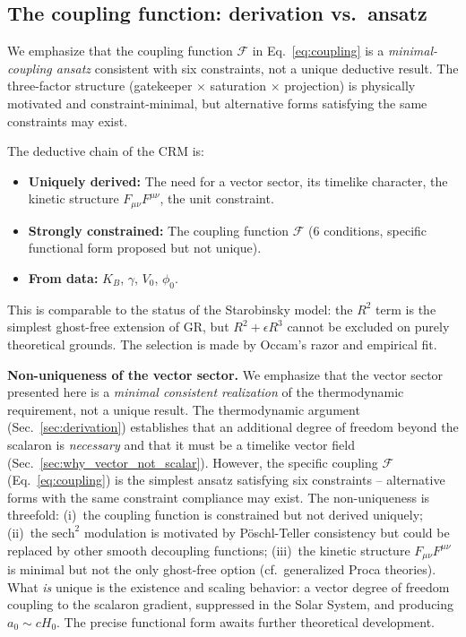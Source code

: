 \documentclass[aps,prd,twocolumn,superscriptaddress,nofootinbib]{revtex4-2}
\begin{document}
\subsection{The coupling function: derivation vs.\ ansatz}

We emphasize that the coupling function $\mathcal{F}$ in Eq.~\eqref{eq:coupling} is a \textit{minimal-coupling ansatz} consistent with six constraints, not a unique deductive result. The three-factor structure (gatekeeper $\times$ saturation $\times$ projection) is physically motivated and constraint-minimal, but alternative forms satisfying the same constraints may exist.

The deductive chain of the CRM is:
\begin{itemize}
\item \textbf{Uniquely derived:} The need for a vector sector, its timelike character, the kinetic structure $F_{\mu\nu}F^{\mu\nu}$, the unit constraint.
\item \textbf{Strongly constrained:} The coupling function $\mathcal{F}$ (6 conditions, specific functional form proposed but not unique).
\item \textbf{From data:} $K_B$, $\gamma$, $V_0$, $\phi_0$.
\end{itemize}

This is comparable to the status of the Starobinsky model: the $R^2$ term is the simplest ghost-free extension of GR, but $R^2 + \epsilon R^3$ cannot be excluded on purely theoretical grounds. The selection is made by Occam's razor and empirical fit.

\textbf{Non-uniqueness of the vector sector.} We emphasize that the vector sector presented here is a \emph{minimal consistent realization} of the thermodynamic requirement, not a unique result. The thermodynamic argument (Sec.~\ref{sec:derivation}) establishes that an additional degree of freedom beyond the scalaron is \emph{necessary} and that it must be a timelike vector field (Sec.~\ref{sec:why_vector_not_scalar}). However, the specific coupling $\mathcal{F}$ (Eq.~\ref{eq:coupling}) is the simplest ansatz satisfying six constraints -- alternative forms with the same constraint compliance may exist. The non-uniqueness is threefold: (i)~the coupling function is constrained but not derived uniquely; (ii)~the $\mathrm{sech}^2$ modulation is motivated by P\"oschl-Teller consistency but could be replaced by other smooth decoupling functions; (iii)~the kinetic structure $F_{\mu\nu}F^{\mu\nu}$ is minimal but not the only ghost-free option (cf.\ generalized Proca theories). What \emph{is} unique is the existence and scaling behavior: a vector degree of freedom coupling to the scalaron gradient, suppressed in the Solar System, and producing $a_0 \sim cH_0$. The precise functional form awaits further theoretical development.
\end{document}
